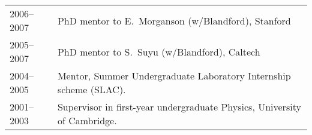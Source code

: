 \begin{tabular}{@{}p{2.5cm}p{15.5cm}}
2006--2007  & PhD mentor to E.~Morganson (w/Blandford), Stanford\\
2005--2007  & PhD mentor to S.~Suyu (w/Blandford), Caltech\\
2004--2005  & Mentor, Summer Undergraduate Laboratory Internship scheme (SLAC).\\
2001--2003  & Supervisor in first-year undergraduate Physics, University of Cambridge.\\
\end{tabular}
